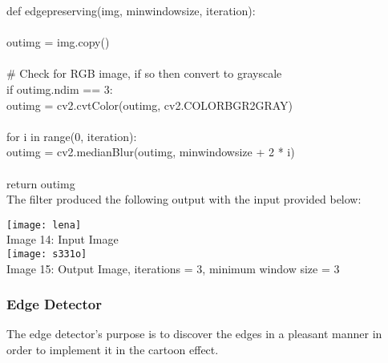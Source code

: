 \documentclass{article}
\begin{document}
	\noindent def edge\textunderscore preserving(img, min\textunderscore window\textunderscore size, iteration):\\
	\\
	\indent out\textunderscore img = img.copy()\\
	\\
	\indent \#     Check for RGB image, if so then convert to grayscale\\
	\indent if out\textunderscore img.ndim == 3:   \\      
	\indent \indent out\textunderscore img = cv2.cvtColor(out\textunderscore img, cv2.COLOR\textunderscore BGR2GRAY)\\
	\\
	\indent for i in range(0, iteration):\\
	\indent \indent out\textunderscore img = cv2.medianBlur(out\textunderscore img, min\textunderscore window\textunderscore size + 2 * i)\\
	\\
	\indent return out\textunderscore img\\
	
	The filter produced the following output with the input provided below:\\
	
	\begin{center}
		\texttt{[image: lena]}\\
		Image 14: Input Image\\
		
		\texttt{[image: s331o]}\\
		Image 15: Output Image, iterations = 3, minimum window size = 3\\
		
	\end{center}
	
	\subsubsection{Edge Detector}
	
	The edge detector's purpose is to discover the edges in a pleasant manner in order to implement it in the cartoon effect. \\
	
\end{document}
